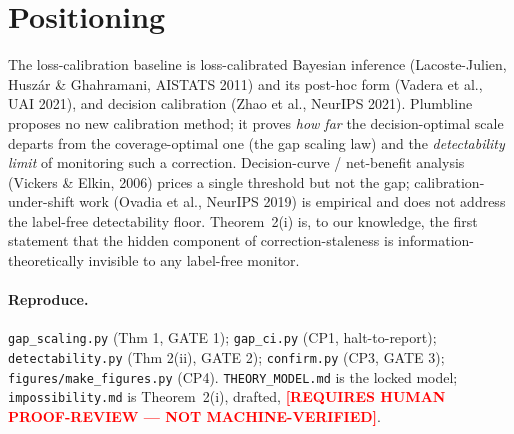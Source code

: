 \documentclass[11pt]{article}
\theoremstyle{plain}
\theoremstyle{definition}
\newcommand{\humanflag}{\textcolor{red}{\textbf{[REQUIRES HUMAN PROOF-REVIEW — NOT MACHINE-VERIFIED]}}}
\begin{document}
\section{Positioning}
The loss-calibration baseline is loss-calibrated Bayesian inference (Lacoste-Julien, Husz\'ar \&
Ghahramani, AISTATS 2011) and its post-hoc form (Vadera et al., UAI 2021), and decision calibration
(Zhao et al., NeurIPS 2021). Plumbline proposes no new calibration method; it proves \emph{how far} the
decision-optimal scale departs from the coverage-optimal one (the gap scaling law) and the
\emph{detectability limit} of monitoring such a correction. Decision-curve / net-benefit analysis
(Vickers \& Elkin, 2006) prices a single threshold but not the gap; calibration-under-shift work
(Ovadia et al., NeurIPS 2019) is empirical and does not address the label-free detectability floor.
Theorem~2(i) is, to our knowledge, the first statement that the hidden component of
correction-staleness is information-theoretically invisible to any label-free monitor.

\paragraph{Reproduce.}
\texttt{gap\_scaling.py} (Thm 1, GATE 1); \texttt{gap\_ci.py} (CP1, halt-to-report);
\texttt{detectability.py} (Thm 2(ii), GATE 2); \texttt{confirm.py} (CP3, GATE 3);
\texttt{figures/make\_figures.py} (CP4). \texttt{THEORY\_MODEL.md} is the locked model;
\texttt{impossibility.md} is Theorem~2(i), drafted, \humanflag.
\end{document}
